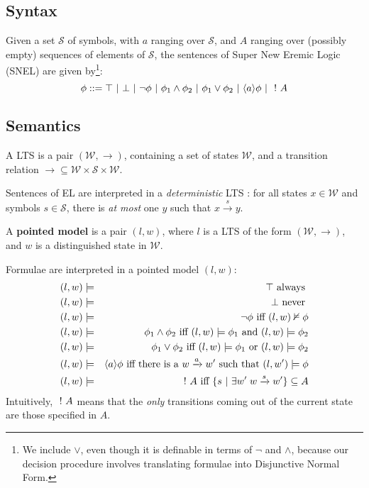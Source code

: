 \subsection{Syntax}
Given a set $\mathcal{S}$ of symbols, with $a$ ranging over $\mathcal{S}$, and $A$ ranging over (possibly empty) sequences of elements of $\mathcal{S}$, the sentences of Super New Eremic Logic (SNEL) are given by\footnote{We include $\lor$, even though it is definable in terms of $\neg$ and $\land$, because our decision procedure involves translating formulae into Disjunctive Normal Form.}:
\[
\phi ::= \top \ | \  \bot \ | \  \neg \phi \ | \  \phi_1 \land \phi_2 \ | \ \phi_1 \lor \phi_2 \ | \  \langle a \rangle \phi \ | \  \ ! \  A 
\]
\subsection{Semantics}
A LTS is a pair $(\mathcal{W}, \rightarrow)$, containing a set of states $\mathcal{W}$, and a transition relation $\rightarrow \subseteq \mathcal{W} \times \mathcal{S} \times \mathcal{W}$.

Sentences of EL are interpreted in a \emph{deterministic} LTS : for all states $x \in \mathcal{W}$ and symbols $s \in \mathcal{S}$, there is \emph{at most} one $y$ such that $x \xrightarrow{s} y$.

A {\bf pointed model} is a pair $(l,w)$, where $l$ is a LTS of the form $(\mathcal{W}, \rightarrow)$, and $w$ is a distinguished state in $\mathcal{W}$.

Formulae are interpreted in a pointed model $(l,w)$:
\begin{eqnarray}
(l,w) & \models & \top  \mbox{ always } \nonumber \\
(l,w) & \models & \bot \mbox{ never }\nonumber \\
(l,w) & \models & \neg \phi \mbox{ iff } (l,w) \nvDash \phi \nonumber \\
(l,w) & \models & \phi_1 \land \phi_2 \mbox{ iff } (l,w)  \models \phi_1 \mbox { and } (l,w) \models \phi_2 \nonumber \\
(l,w) & \models & \phi_1 \lor \phi_2 \mbox{ iff } (l,w)  \models \phi_1 \mbox { or } (l,w) \models \phi_2 \nonumber \\
(l,w) & \models & \langle a \rangle \phi \mbox{ iff there is a } w \xrightarrow{a} w' \mbox { such that } (l,w') \models \phi \nonumber \\
(l,w) & \models & \ ! \  A \mbox{ iff } \{s \ | \  \exists w' \; w \xrightarrow{s} w'\} \subseteq A\nonumber
\end{eqnarray}
Intuitively, $\ ! \  A$ means that the \emph{only} transitions coming out of the current state are those specified in $A$.

